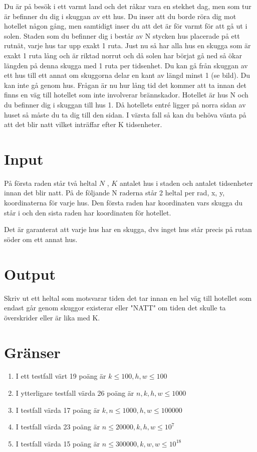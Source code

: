 
Du är på besök i ett varmt land och det råkar vara en stekhet dag, men som tur är befinner du dig i skuggan av ett hus. Du inser att du borde röra dig mot hotellet någon gång, men samtidigt inser du att det är för varmt för att gå ut i solen. Staden som du befinner dig i består av N stycken hus placerade på ett rutnät, varje hus tar upp exakt 1 ruta. Just nu så har alla hus en skugga som är exakt 1 ruta lång och är riktad norrut och då solen har börjat gå ned så ökar längden på denna skugga med 1 ruta per tidsenhet. Du kan gå från skuggan av ett hus till ett annat om skuggorna delar en kant av längd minst 1 (se bild). Du kan inte gå genom hus. Frågan är nu hur lång tid det kommer att ta innan det finns en väg till hotellet som inte involverar brännskador. Hotellet är hus N och du befinner dig i skuggan till hus 1. Då hotellets entré ligger på norra sidan av huset så måste du ta dig till den sidan. I värsta fall så kan du behöva vänta på att det blir natt vilket inträffar efter K tidsenheter.

\section*{Input}
På första raden står två heltal  $N$ , $K$ antalet hus i staden och antalet tidsenheter innan det blir natt. På de följande N raderna står 2 heltal per rad, x, y, koordinaterna för varje hus. Den första raden har koordinaten vars skugga du står i och den sista raden har koordinaten för hotellet.

Det är garanterat att varje hus har en skugga, dvs inget hus står precis på rutan söder om ett annat hus.

\section*{Output}
Skriv ut ett heltal som motsvarar tiden det tar innan en hel väg till hotellet som endast går genom skuggor existerar eller "NATT" om tiden det skulle ta överskrider eller är lika med K.

\section*{Gränser}

\begin{enumerate}
\item I ett testfall värt 19 poäng är $k \le 100, h, w \le 100$
\item I ytterligare testfall värda 26 poäng är $n, k, h, w \le 1000$
\item I testfall värda 17 poäng är $k, n \le 1000, h, w \le 100000$
\item I testfall värda 23 poäng är $n \le 20000, k, h, w \le 10^7$
\item I testfall värda 15 poäng är $n \le 300000, k, w, w \le 10^18$
\end{enumerate}
